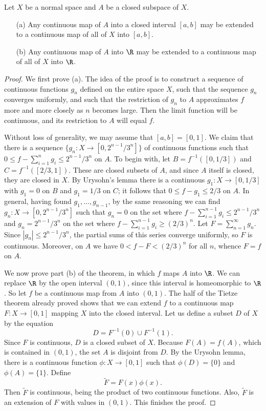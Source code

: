 \begin{theorem}
Let $X$ be a normal space and $A$ be a closed subspace of $X$.
\begin{itemize}
\item[(a)] Any continuous map of $A$ into a closed interval $[a,b]$ may be extended to a continuous map of all of $X$ into $[a,b]$.
\item[(b)] Any continuous map of $A$ into $\R$ may be extended to a continuous map of all of $X$ into $\R$.
\end{itemize}
\end{theorem}
\begin{proof}
We first prove (a). The idea of the proof is to construct a sequence of continuous functions $g_n$ defined on the entire space $X$, such that the sequence $g_n$ converges uniformly, and such that the restriction of $g_n$ to $A$ approximates $f$ more and more closely as $n$ becomes large. Then the limit function will be continuous, and its restriction to $A$ will equal $f$.\par
Without loss of generality, we may assume that $[a,b]=[0,1]$. We claim that there is a sequence $\{g_n:X\to [0,2^{n-1}/3^n]\}$ of continuous functions such that $0\leq f-\sum_{i=1}^{n}g_i\leq 2^{n-1}/3^n$ on $A$. To begin with, let $B=f^{-1}([0,1/3])$ and $C=f^{-1}([2/3,1])$. These are closed subsets of $A$, and since $A$ itself is closed, they are closed in $X$. By Urysohn's lemma there is a continuous $g_1:X\to [0,1/3]$ with $g_1=0$ on $B$ and $g_1=1/3$ on $C$; it follows that $0\leq f-g_1\leq 2/3$ on $A$. In general, having found $g_1,\dots,g_{n-1}$, by the same reasoning we can find $g_{n}:X\to[0,2^{n-1}/3^n]$ such that $g_n=0$ on the set where $f-\sum_{i=1}^{n-1}g_i\leq 2^{n-1}/3^n$ and $g_n=2^{n-1}/3^n$ on the set where $f-\sum_{i=1}^{n-1}g_i\geq (2/3)^n$. Let $F=\sum_{n=1}^{\infty}g_n$. Since $|g_n|\leq 2^{n-1}/3^n$, the partial sums of this series converge uniformly, so $F$ is continuous. Moreover, on $A$ we have $0<f-F<(2/3)^n$ for all $n$, whence $F=f$ on $A$.\par
We now prove part (b) of the theorem, in which $f$ maps $A$ into $\R$. We can replace $\R$ by the open interval $(0,1)$, since this interval is homeomorphic to $\R$. So let $f$ be a continuous map from $A$ into $(0,1)$. The half of the Tietze theorem already proved shows that we can extend $f$ to a continuous map $F:X\to[0,1]$ mapping $X$ into the closed interval. Let us define a subset $D$ of $X$ by the equation
\[D=F^{-1}(0)\cup F^{-1}(1).\]
Since $F$ is continuous, $D$ is a closed subset of $X$. Because $F(A)=f(A)$, which is contained in $(0,1)$, the set $A$ is disjoint from $D$. By the Urysohn lemma, there is a continuous function $\phi:X\to[0,1]$ such that $\phi(D)=\{0\}$ and $\phi(A)=\{1\}$. Define
\[\widetilde{F}=F(x)\phi(x).\]
Then $\widetilde{F}$ is continuous, being the product of two continuous functions. Also, $\widetilde{F}$ is an extension of $F$ with values in $(0,1)$. This finishes the proof.
\end{proof}
